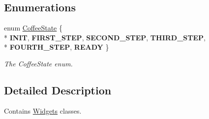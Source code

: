 \subsection*{Enumerations}
\begin{DoxyCompactItemize}
\item 
enum \hyperlink{namespaceGui_1_1Widgets_ac8013eee4a45ee420c7b4f73b2ee95a8}{Coffee\-State} \{ \\*
{\bfseries I\-N\-I\-T}, 
{\bfseries F\-I\-R\-S\-T\-\_\-\-S\-T\-E\-P}, 
{\bfseries S\-E\-C\-O\-N\-D\-\_\-\-S\-T\-E\-P}, 
{\bfseries T\-H\-I\-R\-D\-\_\-\-S\-T\-E\-P}, 
\\*
{\bfseries F\-O\-U\-R\-T\-H\-\_\-\-S\-T\-E\-P}, 
{\bfseries R\-E\-A\-D\-Y}
 \}
\begin{DoxyCompactList}\small\item\em The Coffee\-State enum. \end{DoxyCompactList}\end{DoxyCompactItemize}


\subsection{Detailed Description}
Contains \hyperlink{namespaceGui_1_1Widgets}{Widgets} classes. 